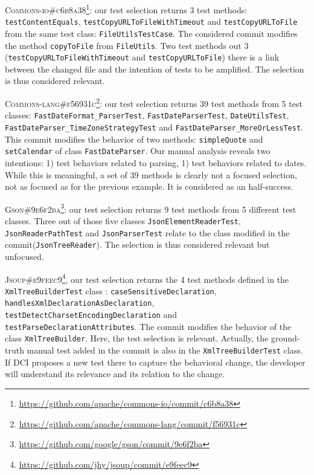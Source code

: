 \textsc{Commons-io\#c6b8a38}\footnote{\url{https://github.com/apache/commons-io/commit/c6b8a38}}: our test selection returns 3 test methods: \texttt{testContentEquals}, \texttt{testCopyURLToFileWithTimeout} and \texttt{testCopyURLToFile} from the same test class: \texttt{FileUtilsTestCase}.
The considered commit modifies the method \texttt{copyToFile} from \texttt{FileUtils}. 
Two test methods out 3 (\texttt{testCopyURLToFileWithTimeout} and \texttt{testCopyURLToFile}) there is a link between the changed file and the intention of tests to be amplified. 
The selection is thus considered relevant.

\textsc{Commons-lang\#f56931c}\footnote{\url{https://github.com/apache/commons-lang/commit/f56931c}}: our test selection returns 39 test methods from 5 test classes: \texttt{FastDateFormat\_ParserTest}, \texttt{FastDateParserTest}, \texttt{DateUtilsTest}, \texttt{FastDateParser\_TimeZoneStrategyTest} and \texttt{FastDateParser\_MoreOrLessTest}.
This commit modifies the behavior of two methods: \texttt{simpleQuote} and \texttt{setCalendar} of class \texttt{FastDateParser}.
Our manual analysis reveals two intentions:
1) test behaviors related to parsing, 
1) test behaviors related to dates.
While this is meaningful, a set of 39 methods is clearly not a focused selection, not as focused as for the previous example.
It is considered as an half-success.

 \textsc{Gson\#9e6f2ba}\footnote{\url{https://github.com/google/gson/commit/9e6f2ba}}: our test selection returns 9 test methods from 5 different test classes.
 Three out of those five classes \texttt{JsonElementReaderTest}, \texttt{JsonReaderPathTest} and \texttt{JsonParserTest} relate to the class modified in the commit(\texttt{JsonTreeReader}).
The selection is thus considered relevant but unfocused.

 \textsc{Jsoup\#e9feec9}\footnote{\url{https://github.com/jhy/jsoup/commit/e9feec9}}, our test selection returns the 4 test methods defined in the \texttt{XmlTreeBuilderTest} class : \texttt{caseSensitiveDeclaration}, \texttt{handlesXmlDeclarationAsDeclaration}, \texttt{testDetectCharsetEncodingDeclaration} and \texttt{testParseDeclarationAttributes}.
 The commit modifies the behavior of the class \texttt{XmlTreeBuilder}.
Here, the test selection is relevant.
Actually, the ground-truth manual test added in the commit is also in the \texttt{XmlTreeBuilderTest} class.
If DCI proposes a new test there to capture the behavioral change, the developer will understand its relevance and its relation to the change.

